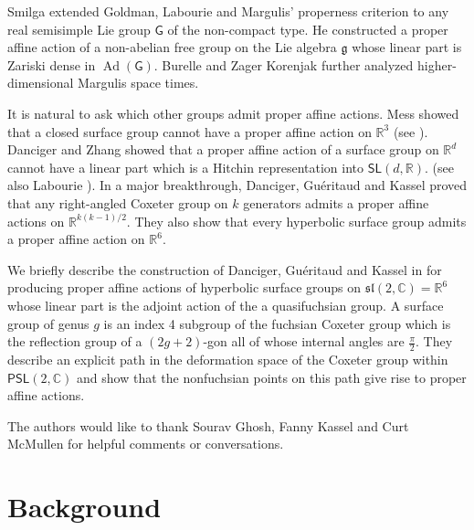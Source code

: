\documentclass{amsart}
\theoremstyle{plain}
\theoremstyle{definition}
\theoremstyle{remark}
\newcommand{\CC}{\mathbb C}
\newcommand{\R}{\mathbb R}
\newcommand{\Ad}{\operatorname{Ad}}
\newcommand{\PSL}{\mathsf{PSL}}
\newcommand{\C}{\mathbb C}
\newcommand{\<}{\left <}
\renewcommand{\>}{\right >}
\renewcommand{\C}{\mathbb C}
\begin{document}
Smilga \cite{Smig} extended  Goldman, Labourie and Margulis' properness criterion to any real semisimple  Lie group $\mathsf{G}$ of the non-compact type. He
constructed a proper affine  action of a non-abelian free group on the Lie algebra $\mathfrak g$ whose  linear part is  Zariski dense in
$\Ad(\mathsf{G})$. Burelle and Zager Korenjak \cite{BZ,neza} further analyzed higher-dimensional Margulis space times.
 
 
 It is natural to ask which other groups admit proper affine actions.
 Mess  \cite{Mess} showed that a closed surface group cannot have a proper affine action on $\R^3$ (see \cite{Mess}). 
 Danciger and Zhang  \cite{DZ} showed that a proper affine action of a surface group on $\mathbb R^d$ cannot have a linear part
 which is a Hitchin representation into $\mathsf{SL}(d,\mathbb R)$.
 (see also Labourie \cite{labourie-entropy}). In a major breakthrough,
 Danciger, Gu\'eritaud and Kassel \cite{DGK-aff} proved that any right-angled Coxeter group on $k$ generators admits a proper affine actions on 
 $\R^{k(k-1)/2}$.  They also show that every hyperbolic surface group admits a proper affine action on $\R^6$. 
 
 We briefly describe the  construction of  Danciger, Gu\'eritaud and Kassel in \cite{DGK-aff}  for producing proper 
 affine actions of hyperbolic surface groups  on $\mathfrak{sl}(2,\CC)= \R^6$ whose linear part is the adjoint action of the a quasifuchsian group.  
 A surface group of genus $g$ is an index 4 subgroup of the fuchsian Coxeter group which is the reflection group of a $(2g+2)$-gon all of whose 
 internal angles are $\frac{\pi}{2}$. They describe an explicit path in the deformation space of the Coxeter group within $\PSL(2,\C)$ and
 show that the nonfuchsian points on this path give rise to proper affine actions.
 
\medskip{} The authors would like to thank Sourav Ghosh, Fanny Kassel and Curt McMullen for helpful
comments or conversations. 



\section{Background}
\end{document}
